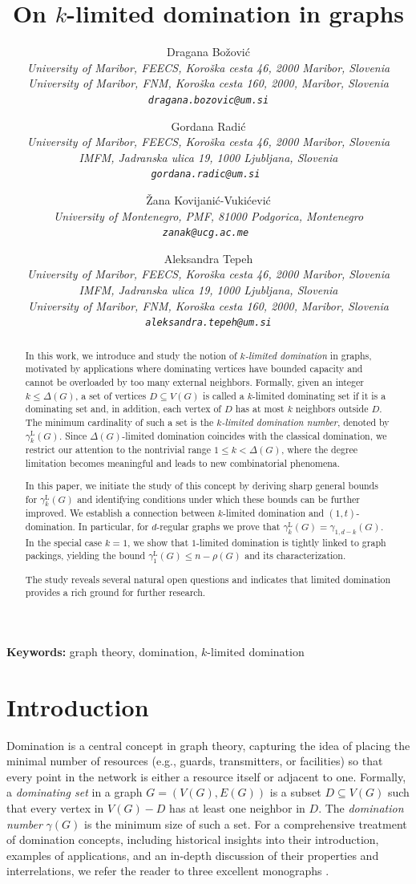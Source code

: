 \documentclass[11pt]{article}
\title{On $k$-limited domination in graphs}
\author{
Dragana Bo\v zovi\'{c} \\
\small \it University of Maribor, FEECS, Koro\v ska cesta 46, 2000 Maribor, Slovenia \\
\small \it University of Maribor, FNM, Koro\v ska cesta 160, 2000, Maribor, Slovenia
\small \tt dragana.bozovic@um.si\\
\and
Gordana Radi\'{c} \\
\small \it University of Maribor, FEECS, Koro\v ska cesta 46, 2000 Maribor, Slovenia \\
\small \it IMFM, Jadranska ulica 19, 1000 Ljubljana, Slovenia \\
\small \tt gordana.radic@um.si
\and 
\v{Z}ana Kovijani\'{c}-Vuki\'{c}evi\'{c} \\
\small \it University of Montenegro, PMF, 81000 Podgorica, Montenegro \\
\small \tt zanak@ucg.ac.me
\and
Aleksandra Tepeh \\
\small \it University of Maribor, FEECS, Koro\v ska cesta 46, 2000 Maribor, Slovenia \\
\small \it IMFM, Jadranska ulica 19, 1000 Ljubljana, Slovenia \\
\small \it University of Maribor, FNM, Koro\v ska cesta 160, 2000, Maribor, Slovenia\\
\small \tt aleksandra.tepeh@um.si \\
}
\date{}
\newcommand{\gammakL}{\gamma_k^{\mathrm L}}
\begin{document}
\maketitle


\begin{abstract}
In this work, we introduce and study the notion of \emph{$k$-limited domination} in graphs, 
motivated by applications where dominating vertices have bounded capacity and cannot be 
overloaded by too many external neighbors. 
Formally, given an integer $k \le \Delta(G)$, a set of vertices $D \subseteq V(G)$ is called 
a $k$-limited dominating set if it is a dominating set and, in addition, each vertex of $D$ 
has at most $k$ neighbors outside $D$. The minimum cardinality of such a set is the 
\emph{$k$-limited domination number}, denoted by $\gammakL(G)$. 
Since $\Delta(G)$-limited domination coincides with the classical domination, we restrict our attention to the nontrivial range $1 \le k < \Delta(G)$, where the degree limitation becomes meaningful and leads to new combinatorial phenomena.

In this paper, we initiate the study of this concept by deriving sharp general bounds for $\gammakL(G)$ and identifying conditions under which these bounds can be further improved. We establish a connection between $k$-limited domination and $(1,t)$-domination. In particular, for $d$-regular graphs we prove that $\gammakL(G)=\gamma_{1,d-k}(G)$. In the special case $k=1$, we show that $1$-limited domination is tightly linked to graph packings, yielding the bound $\gamma^{\mathrm L}_1(G) \le n - \rho(G)$ and its characterization.

The study reveals several natural open questions and indicates that limited domination provides a rich ground for further research.
\end{abstract}


\noindent
{\bf Keywords:} graph theory, domination, $k$-limited domination


\section{Introduction}

Domination is a central concept in graph theory, capturing the idea of placing the minimal number of resources (e.g., guards, transmitters, or facilities) so that every point in the network is either a resource itself or adjacent to one. Formally, a \emph{dominating set} in a graph \(G=(V(G),E(G))\) is a subset \(D\subseteq V(G)\) such that every vertex in \(V(G)-D\) has at least one neighbor in \(D\). The \emph{domination number} \(\gamma(G)\) is the minimum size of such a set.
For a comprehensive treatment of domination concepts, including historical insights into their introduction, examples of applications, and an in-depth discussion of their properties and interrelations, we refer the reader to three excellent monographs \cite{HHH1,HHH3,HHH2}.
\end{document}
